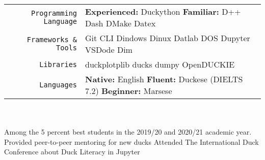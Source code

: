 \documentclass[
    10pt,
    A4,
    english,
    draft = false,
    twoside = false,
]{article}
\begin{document}
	\tab \begin{tabular}{r p{}}
		\texttt{\large Programming Language} & \textbf{Experienced:} Duckython \tab \textbf{Familiar:} D++ \cvContactSep Dash \cvContactSep DMake \cvContactSep Datex\\
		\texttt{\large Frameworks \& Tools} & Git \cvContactSep CLI \cvContactSep Dindows \cvContactSep Dinux \cvContactSep Datlab \cvContactSep DOS \cvContactSep Dupyter \cvContactSep VSDode \cvContactSep Dim \\
		\texttt{\large Libraries} & duckplotplib \cvContactSep ducks \cvContactSep dumpy \cvContactSep OpenDUCKIE\\
		\texttt{\large Languages} & \textbf{Native:} English \cvContactSep \textbf{Fluent:} Duckese (DIELTS 7.2) \cvContactSep \textbf{Beginner:} Marsese \\
	\end{tabular}\\~\\
	{Among the 5 percent best students in the 2019/20 and 2020/21 academic year.}
	{Provided peer-to-peer mentoring for new ducks}
	{Attended The International Duck Conference about Duck Literacy in Jupyter}
\end{document}

